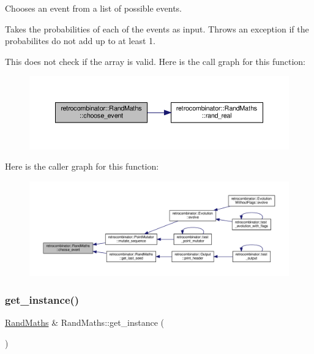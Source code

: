 Chooses an event from a list of possible events. 

Takes the probabilities of each of the events as input. Throws an exception if the probabilites do not add up to at least 1.

This does not check if the array is valid. Here is the call graph for this function\+:
\nopagebreak
\begin{figure}[H]
\begin{center}
\leavevmode
\includegraphics[width=350pt]{classretrocombinator_1_1RandMaths_a3834f9a074546f0d588247610f16fb0e_cgraph}
\end{center}
\end{figure}
Here is the caller graph for this function\+:
\nopagebreak
\begin{figure}[H]
\begin{center}
\leavevmode
\includegraphics[width=350pt]{classretrocombinator_1_1RandMaths_a3834f9a074546f0d588247610f16fb0e_icgraph}
\end{center}
\end{figure}
\mbox{\label{classretrocombinator_1_1RandMaths_ae54dee1a16fb0e275e1624ccaa7dc87e}} 
\subsubsection{\texorpdfstring{get\+\_\+instance()}{get\_instance()}}
{\footnotesize\ttfamily \hyperlink{classretrocombinator_1_1RandMaths}{Rand\+Maths} \& Rand\+Maths\+::get\+\_\+instance (\begin{DoxyParamCaption}{ }\end{DoxyParamCaption})\hspace{0.3cm}{\ttfamily [static]}}



